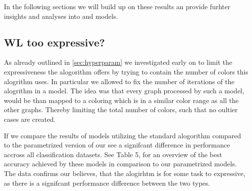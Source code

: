 In the following sections we will build up on these results an provide furhter insights and analyses into \wlnn and \gnn models.

\subsection{WL too expressive?}
As already outlined in \cref{sec:hyperparam} we investigated early on to limit the expressiveness the \wl alogorithm offers by trying to contain the number of colors this alogrithm uses. In particular we allowed to fix the number of iterations of the \wl alogrithm in a \wlnn model. The idea was that every graph processed by such a model, would be than mapped to a coloring which is in a similar color range as all the other graphs. Thereby limiting the total number of colors, such that no oultier cases are created. 

If we compare the results of \wlnn models utilizing the standard \wl alogorithm compared to the parametrized version of our see a signifcant difference in performance accross all classification datasets. See Table 5, for an overview of the best accuracy achieved by these models in comparison to our parametrized models. The data confirms our believes, that the \wl alogirhtm is for some task to expressive, as there is a signifcant performance difference between the two types.

\begin{table}[H]
		\caption{Comparison between the best performing \wlnn models using the standard \wl algorithm and the one employing the parametrized version of it in percent.}
        \label{tab:my_label4}     
\end{table}

